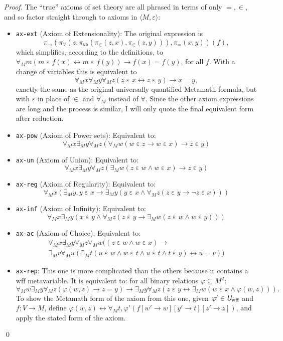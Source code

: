 \documentclass[runningheads,a4paper]{llncs}
\newcommand{\uv}{\textit{\textsf{U}}} %
\newcommand{\ang}[1]{\langle#1\rangle}
\newcommand{\vph}{\varphi}
\newcommand{\ep}{\mathbin{\varepsilon}}
\newcommand{\pt}[1]{\pi_\texttt{#1}}
\begin{document}
\begin{proof}
The ``true'' axioms of set theory are all phrased in terms of only $=,\in$, and so factor straight through to axioms in $\ang{M,\ep}$:
\begin{itemize}
  \item \texttt{ax-ext} (Axiom of Extensionality): The original expression is \[\pi_\to(\pi_\forall(z,\pt{wb}(\pi_\in(z,x),\pi_\in(z,y))),\pi_=(x,y))(f),\]
  which simplifies, according to the definitions, to $\forall_M m(m\ep f(x)\leftrightarrow m\ep f(y))\to f(x)=f(y)$, for all $f$. With a change of variables this is equivalent to \[\forall_M x\forall_M y\forall_M z(z\ep x\leftrightarrow z\ep y)\to x=y,\] exactly the same as the original universally quantified Metamath formula, but with $\ep$ in place of $\in$ and $\forall_M$ instead of $\forall$. Since the other axiom expressions are long and the process is similar, I will only quote the final equivalent form after reduction.
  \item \texttt{ax-pow} (Axiom of Power sets): Equivalent to:
  \[\forall_M x\exists_M y\forall_M z(\forall_M w(w\ep z\to w\ep x)\to z\ep y)\]
  \item \texttt{ax-un} (Axiom of Union): Equivalent to:
  \[\forall_M x\exists_M y\forall_M z(\exists_M w(z\ep w\land w\ep x)\to z\ep y)\]
  \item \texttt{ax-reg} (Axiom of Regularity): Equivalent to:
  \[\forall_M x(\exists_M y,y\ep x\to\exists_M y(y\ep x\land\forall_M z(z\ep y\to\lnot z\ep x)))\]
  \item \texttt{ax-inf} (Axiom of Infinity): Equivalent to:
  \[\forall_M x\exists_M y(x\ep y\land\forall_M z(z\ep y\to\exists_M w(z\ep w\land w\ep y)))\]
  \item \texttt{ax-ac} (Axiom of Choice): Equivalent to:
  \begin{multline*}
  \forall_M x\exists_M y\forall_M z\forall_M w((z\ep w\land w\ep x)\to\\\exists_M v\forall_M u(\exists_M t(u\ep w\land w\ep t\land u\ep t\land t\ep y)\leftrightarrow u=v))
  \end{multline*}
  \item \texttt{ax-rep}:
  This one is more complicated than the others because it contains a $\mathrm{wff}$ metavariable. It is equivalent to: for all binary relations $\vph\subseteq M^2$:
  \[\forall_M w\exists_M y\forall_M z(\vph(w,z)\to z=y)\to\exists_M y\forall_M z(z\ep y\leftrightarrow\exists_M w(w\ep x\land\vph(w,z))).\]
  To show the Metamath form of the axiom from this one, given $\vph'\in\uv_\mathrm{wff}$ and $f:V\to M$, define $\vph(w,z)\leftrightarrow\forall_M t,\vph'(f[w'\to w][y'\to t][z'\to z])$, and apply the stated form of the axiom.
\end{itemize}
\qed\end{proof}
\end{document}
